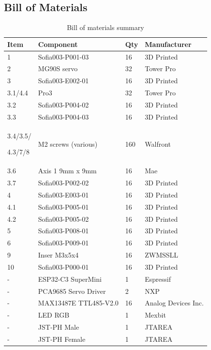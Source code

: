 \documentclass[lettersize,journal]{IEEEtran}
\begin{document}
	\subsection{Bill of Materials}
	
	\begin{table}[H]
		\centering
		\caption{Bill of materials summary}
		\label{tab:bom}
		\begin{tabularx}{\columnwidth}
			{@{}P{1.cm} P{3.5cm} P{0.5cm} Y@{} }
			\hline
			\textbf{Item} & \textbf{Component} & \textbf{Qty} & \textbf{Manufacturer} \\
			 & Sofia003-P001-03 & 16 & 3D Printed \\
			2 & MG90S servo & 32 & Tower Pro \\
			3 & Sofia003-E002-01 & 16 & 3D Printed \\
			3.1/4.4 & Pro3 & 32 & Tower Pro\\
			3.2 & Sofia003-P004-02 & 16 & 3D Printed \\
			3.3 & Sofia003-P004-03 & 16 & 3D Printed \\
			3.4/3.5/
			\par 4.3/7/8 & M2 screws (various) & 160 & Walfront \\
			3.6 & Axis 1 9mm x 9mm & 16 & Mae \\
			3.7 & Sofia003-P002-02 & 16 & 3D Printed \\
			4 & Sofia003-E003-01 & 16 & 3D Printed \\
			4.1 & Sofia003-P005-01 & 16 & 3D Printed \\
			4.2 & Sofia003-P005-02 & 16 & 3D Printed \\
			5 & Sofia003-P008-01 & 16 & 3D Printed \\
			6 & Sofia003-P009-01 & 16 & 3D Printed \\
			9 & Inser M3x5x4 & 16 & ZWMSSLL \\
			10 &Sofia003-P000-01 & 16 & 3D Printed \\
			- & ESP32-C3 SuperMini & 1 & Espressif \\
			- & PCA9685 Servo Driver & 2 & NXP \\
			- & MAX13487E TTL485-V2.0 & 16 & Analog Devices Inc.\\
			- & LED RGB & 1 & Mexbit \\
			- & JST-PH Male & 1 & JTAREA \\
			- & JST-PH Female & 1 & JTAREA \\
			
			\hline
		\end{tabularx}
	\end{table}
	
\end{document}
